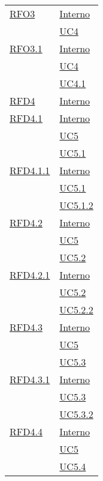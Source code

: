 \begin{longtable}{|>{\centering}m{5cm}|m{5cm}<{\centering}|}
\hyperlink{RFO3}{RFO3} & \hyperlink{Interno}{Interno}\\
& \hyperref[UC4]{UC4}\\ \hline

\hyperlink{RFO3.1}{RFO3.1} & \hyperlink{Interno}{Interno}\\
& \hyperref[UC4]{UC4}\\
& \hyperref[UC4.1]{UC4.1}\\ \hline

\hyperlink{RFD4}{RFD4} & \hyperlink{Interno}{Interno}\\ \hline

\hyperlink{RFD4.1}{RFD4.1} & \hyperlink{Interno}{Interno}\\
& \hyperref[UC5]{UC5}\\
& \hyperref[UC5.1]{UC5.1}\\ \hline

\hyperlink{RFD4.1.1}{RFD4.1.1} & \hyperlink{Interno}{Interno}\\
& \hyperref[UC5.1]{UC5.1}\\
& \hyperref[UC5.1.2]{UC5.1.2}\\ \hline

\hyperlink{RFD4.2}{RFD4.2} & \hyperlink{Interno}{Interno}\\
& \hyperref[UC5]{UC5}\\
& \hyperref[UC5.2]{UC5.2}\\ \hline

\hyperlink{RFD4.2.1}{RFD4.2.1} & \hyperlink{Interno}{Interno}\\
& \hyperref[UC5.2]{UC5.2}\\
& \hyperref[UC5.2.2]{UC5.2.2}\\ \hline

\hyperlink{RFD4.3}{RFD4.3} & \hyperlink{Interno}{Interno}\\
& \hyperref[UC5]{UC5}\\
& \hyperref[UC5.3]{UC5.3}\\ \hline

\hyperlink{RFD4.3.1}{RFD4.3.1} & \hyperlink{Interno}{Interno}\\
& \hyperref[UC5.3]{UC5.3}\\
& \hyperref[UC5.3.2]{UC5.3.2}\\ \hline

\hyperlink{RFD4.4}{RFD4.4} & \hyperlink{Interno}{Interno}\\
& \hyperref[UC5]{UC5}\\
& \hyperref[UC5.4]{UC5.4}\\ \hline


\end{longtable}
